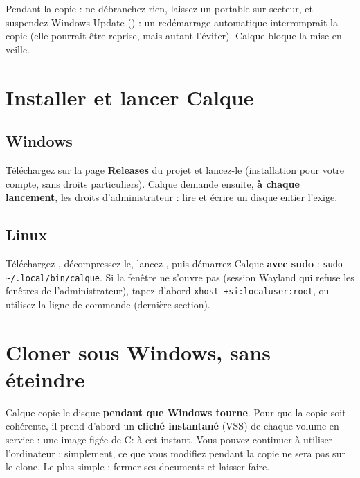 Pendant la copie : ne débranchez rien, laissez un portable sur secteur, et suspendez Windows Update
() : un redémarrage automatique interromprait la copie (elle
pourrait être reprise, mais autant l'éviter). Calque bloque la mise en veille.

\section{Installer et lancer Calque}

\subsection*{Windows}
Téléchargez  sur la page \textbf{Releases} du projet et lancez-le
(installation pour votre compte, sans droits particuliers). Calque demande ensuite, \textbf{à chaque
lancement}, les droits d'administrateur : lire et écrire un disque entier l'exige.

\subsection*{Linux}
Téléchargez , décompressez-le, lancez ,
puis démarrez Calque \textbf{avec sudo} : \texttt{sudo \textasciitilde/.local/bin/calque}.
Si la fenêtre ne s'ouvre pas (session Wayland qui refuse les fenêtres de l'administrateur), tapez
d'abord \texttt{xhost +si:localuser:root}, ou utilisez la ligne de commande (dernière section).

\section{Cloner sous Windows, sans éteindre}\label{sec:windows}

Calque copie le disque \textbf{pendant que Windows tourne}. Pour que la copie soit cohérente, il
prend d'abord un \textbf{cliché instantané} (VSS) de chaque volume en service : une image figée de
C: à cet instant. Vous pouvez continuer à utiliser l'ordinateur ; simplement, ce que vous modifiez
pendant la copie ne sera pas sur le clone. Le plus simple : fermer ses documents et laisser faire.


